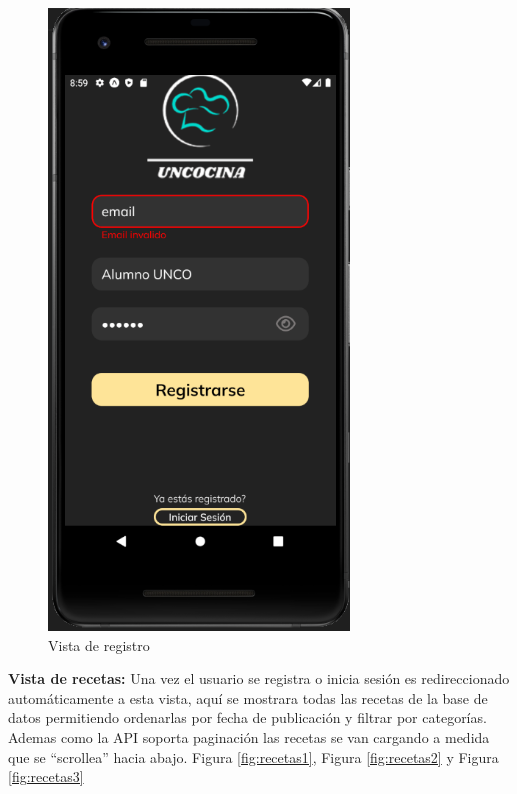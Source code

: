 \begin{figure}[!h]
  \centering
  \includegraphics[width=8cm, scale=1]{Images/Imagenes/registro.png}
  \caption{Vista de registro}
  \label{fig:registro}
\end{figure}

\textbf{Vista de recetas: }
Una vez el usuario se registra o inicia sesión es redireccionado automáticamente a esta vista, aquí se mostrara todas las recetas de la base de datos permitiendo ordenarlas por fecha de publicación y filtrar por categorías. Ademas como la API soporta paginación las recetas se van cargando a medida que se ``scrollea'' hacia abajo. Figura \ref{fig:recetas1}, Figura \ref{fig:recetas2} y Figura \ref{fig:recetas3}\\

